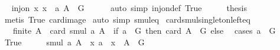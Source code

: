 \begin{isabellebody}
\ \isamarkupfalse%
\ {\isachardoublequoteopen}inj{\isacharunderscore}{\kern0pt}on\ {\isacharparenleft}{\kern0pt}{\isasymlambda}x{\isachardot}{\kern0pt}\ x\ {\isasymcdot}\ a{\isacharparenright}{\kern0pt}\ {\isacharparenleft}{\kern0pt}A\ {\isasyminter}\ G{\isacharparenright}{\kern0pt}{\isachardoublequoteclose}\isanewline
\ \ \ \ \isamarkupfalse%
\ {\isacharparenleft}{\kern0pt}auto\ simp{\isacharcolon}{\kern0pt}\ inj{\isacharunderscore}{\kern0pt}on{\isacharunderscore}{\kern0pt}def\ True{\isacharparenright}{\kern0pt}\isanewline
\ \ \isamarkupfalse%
\ \isamarkupfalse%
\ {\isacharquery}{\kern0pt}thesis\isanewline
\ \ \ \ \isamarkupfalse%
\ {\isacharparenleft}{\kern0pt}metis\ True\ card{\isacharunderscore}{\kern0pt}image{\isacharparenright}{\kern0pt}\isanewline
{}\isamarkupfalse%
\ {\isacharparenleft}{\kern0pt}auto\ simp{\isacharcolon}{\kern0pt}\ smul{\isacharunderscore}{\kern0pt}eq{\isacharparenright}{\kern0pt}%
\endisatagproof
{\isafoldproof}%
%
\isadelimproof
\isanewline
%
\endisadelimproof
\isanewline
{}\isamarkupfalse%
\ card{\isacharunderscore}{\kern0pt}smul{\isacharunderscore}{\kern0pt}singleton{\isacharunderscore}{\kern0pt}left{\isacharunderscore}{\kern0pt}eq{\isacharcolon}{\kern0pt}\isanewline
\ \ \ {\isachardoublequoteopen}finite\ A{\isachardoublequoteclose}\ \ {\isachardoublequoteopen}card\ {\isacharparenleft}{\kern0pt}smul\ {\isacharbraceleft}{\kern0pt}a{\isacharbraceright}{\kern0pt}\ A{\isacharparenright}{\kern0pt}\ {\isacharequal}{\kern0pt}\ {\isacharparenleft}{\kern0pt}if\ a\ {\isasymin}\ G\ then\ card\ {\isacharparenleft}{\kern0pt}A\ {\isasyminter}\ G{\isacharparenright}{\kern0pt}\ else\ {}{\isacharparenright}{\kern0pt}{\isachardoublequoteclose}\isanewline
%
\isadelimproof
%
\endisadelimproof
%
\isatagproof
{}\isamarkupfalse%
\ {\isacharparenleft}{\kern0pt}cases\ {\isachardoublequoteopen}a\ {\isasymin}\ G{\isachardoublequoteclose}{\isacharparenright}{\kern0pt}\isanewline
\ \ \isamarkupfalse%
\ True\isanewline
\ \ \isamarkupfalse%
\ \isamarkupfalse%
\ {\isachardoublequoteopen}smul\ {\isacharbraceleft}{\kern0pt}a{\isacharbraceright}{\kern0pt}\ A\ {\isacharequal}{\kern0pt}\ {\isacharparenleft}{\kern0pt}{\isasymlambda}x{\isachardot}{\kern0pt}\ a\ {\isasymcdot}\ x{\isacharparenright}{\kern0pt}\ {\isacharbackquote}{\kern0pt}\ {\isacharparenleft}{\kern0pt}A\ {\isasyminter}\ G{\isacharparenright}{\kern0pt}{\isachardoublequoteclose}\isanewline

\end{isabellebody}
